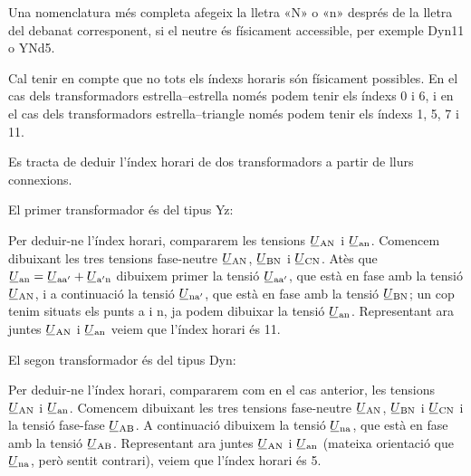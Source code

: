 Una nomenclatura més completa afegeix la lletra «N» o «n» després de la lletra del debanat corresponent, si el neutre és físicament accessible, per exemple Dyn11 o YNd5.

Cal tenir en compte que no tots els índexs horaris són físicament possibles. En el cas dels transformadors estrella--estrella només podem tenir els índexs 0 i 6, i en el cas dels transformadors estrella--triangle només podem tenir els índexs 1, 5, 7 i 11.

\begin{exemple}[\IndexHorari{}]
	\addcontentsxms{\IndexHorari}
    Es tracta de deduir l'índex horari de dos transformadors a partir de llurs connexions.


    El primer transformador és del tipus Yz:
     \vspace{-2mm}
    \begin{center}
        
    \end{center}
     Per deduir-ne l'índex horari, compararem les tensions
    $\cmplx{U}\ped{AN}$ i $\cmplx{U}\ped{an}$. Comencem dibuixant les tres tensions fase-neutre $\cmplx{U}\ped{AN}$, $\cmplx{U}\ped{BN}$ i $\cmplx{U}\ped{CN}$. Atès que $\cmplx{U}\ped{an} = \cmplx{U}\ped{aa'} + \cmplx{U}\ped{a'n}$ dibuixem primer la tensió $\cmplx{U}\ped{aa'}$, que està en fase amb la tensió $\cmplx{U}\ped{AN}$, i a continuació la tensió $\cmplx{U}\ped{na'}$, que està en fase amb la tensió $\cmplx{U}\ped{BN}$; un cop tenim situats els punts a i n, ja podem dibuixar la tensió $\cmplx{U}\ped{an}$. Representant ara juntes $\cmplx{U}\ped{AN}$ i $\cmplx{U}\ped{an}$  veiem que l'índex horari és 11.


     El segon transformador és del tipus Dyn:
      \vspace{-2mm}
    \begin{center}
       
    \end{center}
      Per  deduir-ne l'índex horari, compararem com en el cas anterior, les tensions $\cmplx{U}\ped{AN}$ i $\cmplx{U}\ped{an}$. Comencem dibuixant les tres tensions fase-neutre $\cmplx{U}\ped{AN}$, $\cmplx{U}\ped{BN}$ i $\cmplx{U}\ped{CN}$ i la tensió fase-fase $\cmplx{U}\ped{AB}$.  A continuació dibuixem la tensió $\cmplx{U}\ped{na}$, que està en fase amb la tensió $\cmplx{U}\ped{AB}$. Representant ara juntes $\cmplx{U}\ped{AN}$ i $\cmplx{U}\ped{an}$ (mateixa orientació que $\cmplx{U}\ped{na}$, però sentit contrari),  veiem que l'índex horari és 5.
\end{exemple}

